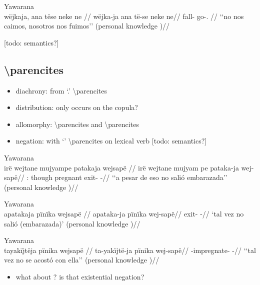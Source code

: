 \documentclass{memoir}
\begin{document}
\ex  Yawarana  \\\label{conv1stenc-28}
\begingl \glpreamble wëjkaja, ana tëse neke ne //
\gla wëjka-ja ana të-se neke ne//
\glb fall-  go-.  //
\glft ‘‘no nos caimos, nosotros nos fuimos’’ (personal knowledge
)//
\endgl
\xe

{[}todo: semantics?{]}

\subsection{\texorpdfstring{
\textbackslash parencites}{ \textbackslash parencites}}

\begin{itemize}
\tightlist
\item
  diachrony: from  `.'
  \textbackslash parencites
\item
  distribution: only occurs on the copula?
\item
  allomorphy:  \textbackslash parencites and 
  \textbackslash parencites
\item
  negation: with  `' \textbackslash parencites on
  lexical verb  {[}todo:
  semantics?{]}
\end{itemize}

\ex  Yawarana  \\\label{ctoaragrme-38}
\begingl \glpreamble irë wejtane mujyampe patakaja wejsapë //
\gla irë wejtane mujyam pe pataka-ja wej-sapë//
\glb {}: though pregnant  exit- -//
\glft ‘‘a pesar de eso no salió embarazada’’ (personal knowledge
)//
\endgl
\xe

\ex  Yawarana  \\\label{ctoaragrme-39}
\begingl \glpreamble apatakaja pïnïka wejsapë //
\gla apataka-ja pïnïka wej-sapë//
\glb exit-  -//
\glft ‘tal vez no salió (embarazada)’ (personal knowledge
)//
\endgl
\xe

\ex  Yawarana  \\\label{ctoaragrme-40}
\begingl \glpreamble tayakïjtëja pïnika wejsapë //
\gla ta-yakïjtë-ja pïnika wej-sapë//
\glb {}-impregnate-  -//
\glft ‘‘tal vez no se acostó con ella’’ (personal knowledge
)//
\endgl
\xe

\begin{itemize}
\tightlist
\item
  what about ? is that existential negation?
\end{itemize}
\end{document}
